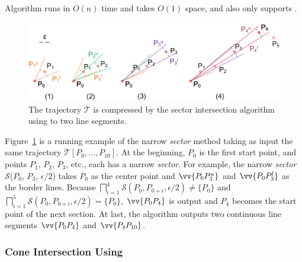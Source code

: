 Algorithm \siped runs in $O(n)$ time and takes $O(1)$ space, and \siped also only supports \ped.


\begin{figure}[tb!]
	\centering
	\includegraphics[scale=0.66]{Figures/Fig-sleeve.png}
	\vspace{-5ex}
	\caption{\small The trajectory $\dddot{\mathcal{T}}$ is compressed by the sector intersection algorithm using \ped to two line segments.}
	\vspace{-2ex}
	\label{fig:sleeve}
\end{figure}


\begin{example}
	\label{exm-alg-sleeve}
	Figure~\ref{fig:sleeve} is a running example of the narrow \emph{sector} method taking as input the same trajectory $\dddot{\mathcal{T}}[P_0, \ldots, P_{10}]$. At the beginning, $P_0$ is the first start point, and points $P_1$, $P_2$, $P_3$, etc., each has a narrow \emph{sector}.
	For example, the narrow \emph{sector} $\mathcal{S}$($P_0$, $P_{3}$, $\epsilon/2$) takes $P_0$ as the center point and $\vv{P_0P^u_{3}}$ and $\vv{P_0P^l_{3}}$ as the border lines.
	Because $\bigsqcap_{i=1}^{4}\mathcal{S}(P_0, P_{0+i}, \epsilon/2) \ne \{P_0\}$ and $\bigsqcap_{i=1}^{5}\mathcal{S}(P_0, P_{0+i}, \epsilon/2) = \{P_0\}$, $\vv{P_0P_4}$ is output and $P_4$ becomes the start point of the next section.
	At last, the algorithm outputs two continuous line segments $\vv{P_0P_4}$ and $\vv{P_4P_{10}}$.
\end{example}



\vspace{-0.5ex}
\subsubsection {Cone Intersection Using \sed}
\label{sec-cised}

